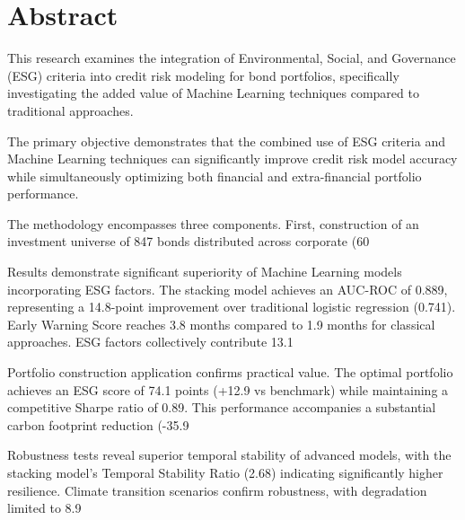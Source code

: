 \chapter*{Abstract}

This research examines the integration of Environmental, Social, and Governance (ESG) criteria into credit risk modeling for bond portfolios, specifically investigating the added value of Machine Learning techniques compared to traditional approaches.

The primary objective demonstrates that the combined use of ESG criteria and Machine Learning techniques can significantly improve credit risk model accuracy while simultaneously optimizing both financial and extra-financial portfolio performance.

The methodology encompasses three components. First, construction of an investment universe of 847 bonds distributed across corporate (60%

Results demonstrate significant superiority of Machine Learning models incorporating ESG factors. The stacking model achieves an AUC-ROC of 0.889, representing a 14.8-point improvement over traditional logistic regression (0.741). Early Warning Score reaches 3.8 months compared to 1.9 months for classical approaches. ESG factors collectively contribute 13.1%

Portfolio construction application confirms practical value. The optimal portfolio achieves an ESG score of 74.1 points (+12.9 vs benchmark) while maintaining a competitive Sharpe ratio of 0.89. This performance accompanies a substantial carbon footprint reduction (-35.9%

Robustness tests reveal superior temporal stability of advanced models, with the stacking model's Temporal Stability Ratio (2.68) indicating significantly higher resilience. Climate transition scenarios confirm robustness, with degradation limited to 8.9%

